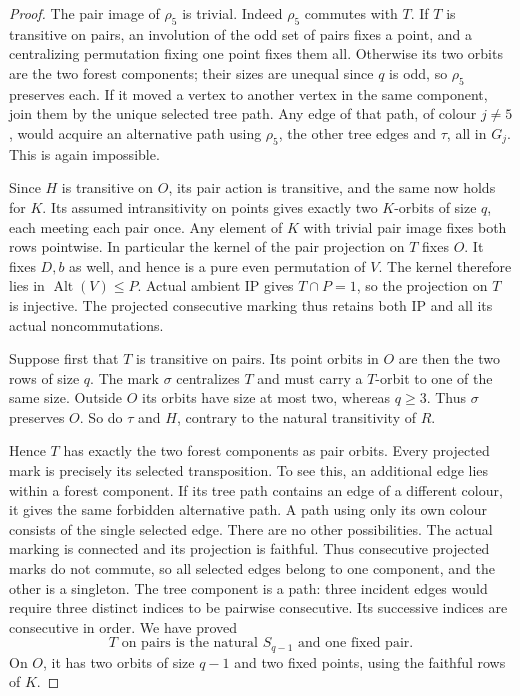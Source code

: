 \documentclass[11pt,a4paper]{article}
\newcommand{\Alt}{\operatorname{Alt}}
\begin{document}
\begin{proof}
The pair image of $\rho_5$ is trivial. Indeed $\rho_5$
commutes with $T$. If $T$ is transitive on pairs,
an involution of the odd set of pairs fixes a point,
and a centralizing permutation fixing one point fixes
them all. Otherwise its two orbits are the two forest
components; their sizes are unequal since $q$ is odd,
so $\rho_5$ preserves each. If it moved a vertex to
another vertex in the same component, join them by
the unique selected tree path. Any edge of that path,
of colour $j\ne5$, would acquire an alternative path
using $\rho_5$, the other tree edges and $\tau$, all
in $G_j$. This is again impossible.

Since $H$ is transitive on $O$, its pair action is
transitive, and the same now holds for $K$. Its assumed
intransitivity on points gives exactly two $K$-orbits
of size $q$, each meeting each pair once. Any element
of $K$ with trivial pair image fixes both rows
pointwise. In particular the kernel of the pair
projection on $T$ fixes $O$. It fixes $D,b$ as well,
and hence is a pure even permutation of $V$. The kernel
therefore lies in $\Alt(V)\le P$. Actual ambient IP
gives $T\cap P=1$, so the projection on $T$ is injective.
The projected consecutive marking thus retains both
IP and all its actual noncommutations.

Suppose first that $T$ is transitive on pairs. Its
point orbits in $O$ are then the two rows of size $q$.
The mark $\sigma$ centralizes $T$ and must carry a
$T$-orbit to one of the same size. Outside $O$ its
orbits have size at most two, whereas $q\ge3$.
Thus $\sigma$ preserves $O$. So do $\tau$ and $H$,
contrary to the natural transitivity of $R$.

Hence $T$ has exactly the two forest components as
pair orbits. Every projected mark is precisely its
selected transposition. To see this, an additional
edge lies within a forest component. If its tree
path contains an edge of a different colour, it
gives the same forbidden alternative path. A path
using only its own colour consists of the single
selected edge. There are no other possibilities.
The actual marking is connected and its projection
is faithful. Thus consecutive projected marks do
not commute, so all selected edges belong to one
component, and the other is a singleton. The tree
component is a path: three incident edges would
require three distinct indices to be pairwise
consecutive. Its successive indices are consecutive
in order. We have proved
\[
       T\text{ on pairs is the natural }S_{q-1}
       \text{ and one fixed pair}.                    \tag{3}
\]
On $O$, it has two orbits of size $q-1$ and two fixed
points, using the faithful rows of $K$.


\end{proof}
\end{document}
